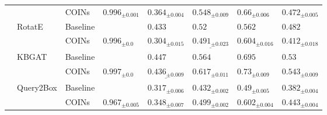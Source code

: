 \begin{table}[!ht]
\begin{adjustbox}{width=\textwidth}
\begin{tabular}{llllllll}
         &           & COINs &  ${{0.996}_{\pm 0.001}}$ &     $\mathbf{{0.364}_{\pm 0.004}}$ &     $\mathbf{{0.548}_{\pm 0.009}}$ &      $\mathbf{{0.66}_{\pm 0.006}}$ &     $\mathbf{{0.472}_{\pm 0.005}}$ \\
         & RotatE & Baseline &                          &                        ${{0.433}}$ &                         ${{0.52}}$ &                        ${{0.562}}$ &                        ${{0.482}}$ \\
         &           & COINs &    ${{0.996}_{\pm 0.0}}$ &            ${{0.304}_{\pm 0.015}}$ &  $\underline{{0.491}_{\pm 0.023}}$ &     $\mathbf{{0.604}_{\pm 0.016}}$ &            ${{0.412}_{\pm 0.018}}$ \\
         & KBGAT & Baseline &                          &                        ${{0.447}}$ &                        ${{0.564}}$ &                        ${{0.695}}$ &                         ${{0.53}}$ \\
         &           & COINs &    ${{0.997}_{\pm 0.0}}$ &  $\underline{{0.436}_{\pm 0.009}}$ &     $\mathbf{{0.617}_{\pm 0.011}}$ &      $\mathbf{{0.73}_{\pm 0.009}}$ &     $\mathbf{{0.543}_{\pm 0.009}}$ \\
         & Query2Box & Baseline &                          &            ${{0.317}_{\pm 0.006}}$ &            ${{0.432}_{\pm 0.002}}$ &             ${{0.49}_{\pm 0.005}}$ &            ${{0.382}_{\pm 0.004}}$ \\
         &           & COINs &  ${{0.967}_{\pm 0.005}}$ &     $\mathbf{{0.348}_{\pm 0.007}}$ &     $\mathbf{{0.499}_{\pm 0.002}}$ &     $\mathbf{{0.602}_{\pm 0.004}}$ &     $\mathbf{{0.443}_{\pm 0.004}}$ \\
\bottomrule
\end{tabular}
  \end{adjustbox}
\end{table}

